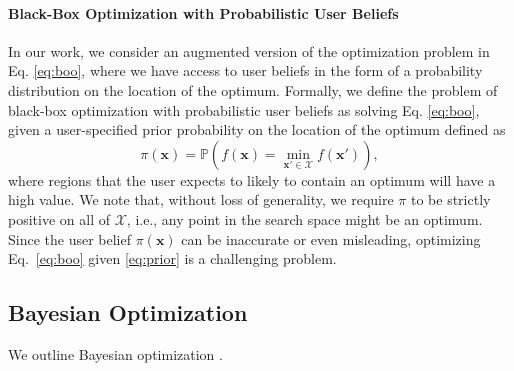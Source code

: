 \documentclass{article}
\newcommand{\pri}[0]{{\pi}}
\begin{document}
\paragraph{Black-Box Optimization with Probabilistic User Beliefs}
In our work, we consider an augmented version of the optimization problem in Eq. \eqref{eq:boo}, where we have access to user beliefs in the form of a probability distribution on the location of the optimum. Formally, we define the problem of black-box optimization with probabilistic user beliefs as solving Eq. \eqref{eq:boo}, given a user-specified prior probability on the location of the optimum defined as
\begin{equation}
    \pri (\bm{x}) = \mathbb{P}\left(f(\bm{x}) = \min_{\bm{x}'\in\mathcal{X}} f(\bm{x}')\right),
    \label{eq:prior}
\end{equation}
where regions that the user expects to likely to contain an optimum will have a high value. We note that, without loss of generality, we require $\pri$ to be strictly positive on all of $\mathcal{X}$, i.e., any point in the search space might be an optimum. Since the user belief $\pri (\bm{x})$ can be inaccurate or even misleading, optimizing Eq.~\eqref{eq:boo} given \eqref{eq:prior} is a challenging problem.


\subsection{Bayesian Optimization}\label{sec:bo}

We outline Bayesian optimization \citep{Mockus1978,brochu-arXiv10a,shahriari-ieee16a}.

\end{document}
